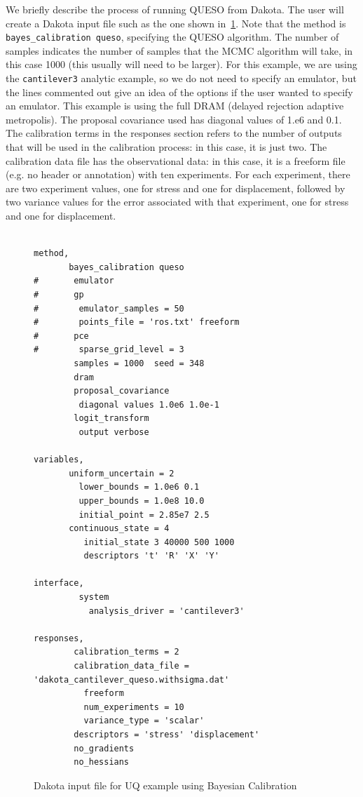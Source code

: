 We briefly describe the process of running QUESO from Dakota.
The user will create a Dakota input file such as the one shown 
in~\ref{uq:figure18}. 
Note that the method is \texttt{bayes\_calibration queso}, 
specifying the QUESO algorithm. The number of 
samples indicates the number of samples that the MCMC algorithm 
will take, in this case 1000 (this usually will need to be larger). 
For this example, we are using the \texttt{cantilever3} analytic 
example, so we do not need to specify an emulator, but the lines 
commented out give an idea of the options if the user wanted to 
specify an emulator. This example is using the full DRAM (delayed
rejection adaptive metropolis). The proposal covariance 
used has diagonal values of 1.e6 and 0.1.  
The calibration terms in the responses section refers to the 
number of outputs that will be used in the calibration process:  
in this case, it is just two. The calibration data file 
has the observational data:  in this case, it is a freeform file 
(e.g. no header or annotation) with ten experiments. For each 
experiment, there are two experiment values, one for stress and one for displacement, followed 
by two variance values for the error associated with that experiment, one for stress and one for displacement. 

\begin{figure}[htbp!]
\centering
\begin{bigbox}
\begin{small}
\begin{verbatim}

method,
       bayes_calibration queso
#       emulator
#       gp
#        emulator_samples = 50
#        points_file = 'ros.txt' freeform
#       pce 
#        sparse_grid_level = 3 
        samples = 1000  seed = 348                                    
        dram 
        proposal_covariance
         diagonal values 1.0e6 1.0e-1
        logit_transform
         output verbose
 
variables,
       uniform_uncertain = 2
         lower_bounds = 1.0e6 0.1
         upper_bounds = 1.0e8 10.0
         initial_point = 2.85e7 2.5
       continuous_state = 4
          initial_state 3 40000 500 1000
          descriptors 't' 'R' 'X' 'Y'

interface,
         system
           analysis_driver = 'cantilever3'

responses,
        calibration_terms = 2
        calibration_data_file = 'dakota_cantilever_queso.withsigma.dat'
          freeform
          num_experiments = 10
          variance_type = 'scalar'
        descriptors = 'stress' 'displacement'
        no_gradients
        no_hessians
\end{verbatim}
\end{small}
\end{bigbox}
\caption{Dakota input file for UQ example using Bayesian Calibration}
\label{uq:figure18}
\end{figure}

